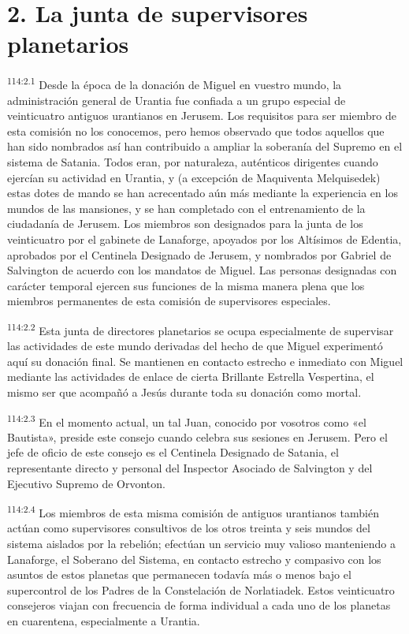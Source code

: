 \section*{2. La junta de supervisores planetarios}
\par
\textsuperscript{114:2.1} Desde la época de la donación de Miguel en vuestro mundo, la administración general de Urantia fue confiada a un grupo especial de veinticuatro antiguos urantianos en Jerusem. Los requisitos para ser miembro de esta comisión no los conocemos, pero hemos observado que todos aquellos que han sido nombrados así han contribuido a ampliar la soberanía del Supremo en el sistema de Satania. Todos eran, por naturaleza, auténticos dirigentes cuando ejercían su actividad en Urantia, y (a excepción de Maquiventa Melquisedek) estas dotes de mando se han acrecentado aún más mediante la experiencia en los mundos de las mansiones, y se han completado con el entrenamiento de la ciudadanía de Jerusem. Los miembros son designados para la junta de los veinticuatro por el gabinete de Lanaforge, apoyados por los Altísimos de Edentia, aprobados por el Centinela Designado de Jerusem, y nombrados por Gabriel de Salvington de acuerdo con los mandatos de Miguel. Las personas designadas con carácter temporal ejercen sus funciones de la misma manera plena que los miembros permanentes de esta comisión de supervisores especiales.

\par
\textsuperscript{114:2.2} Esta junta de directores planetarios se ocupa especialmente de supervisar las actividades de este mundo derivadas del hecho de que Miguel experimentó aquí su donación final. Se mantienen en contacto estrecho e inmediato con Miguel mediante las actividades de enlace de cierta Brillante Estrella Vespertina, el mismo ser que acompañó a Jesús durante toda su donación como mortal.

\par
\textsuperscript{114:2.3} En el momento actual, un tal Juan, conocido por vosotros como «el Bautista», preside este consejo cuando celebra sus sesiones en Jerusem. Pero el jefe de oficio de este consejo es el Centinela Designado de Satania, el representante directo y personal del Inspector Asociado de Salvington y del Ejecutivo Supremo de Orvonton.

\par
\textsuperscript{114:2.4} Los miembros de esta misma comisión de antiguos urantianos también actúan como supervisores consultivos de los otros treinta y seis mundos del sistema aislados por la rebelión; efectúan un servicio muy valioso manteniendo a Lanaforge, el Soberano del Sistema, en contacto estrecho y compasivo con los asuntos de estos planetas que permanecen todavía más o menos bajo el supercontrol de los Padres de la Constelación de Norlatiadek. Estos veinticuatro consejeros viajan con frecuencia de forma individual a cada uno de los planetas en cuarentena, especialmente a Urantia.

